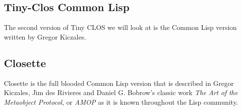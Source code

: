 \documentclass[11pt]{article}
\begin{document}
\subsection{Tiny-Clos Common Lisp}
\label{sec-1.3}

The second version of Tiny CLOS we will look at is the
Common Lisp version written by Gregor Kiczales.

\subsection{Closette}
\label{sec-1.4}

Closette is the full blooded Common Lisp version that
is described in Gregor Kiczales, Jim des Rivieres and
Daniel G. Bobrow's classic work \emph{The Art of the Metaobject Protocol},
or \emph{AMOP} as it is known throughout the Lisp community.
\end{document}
